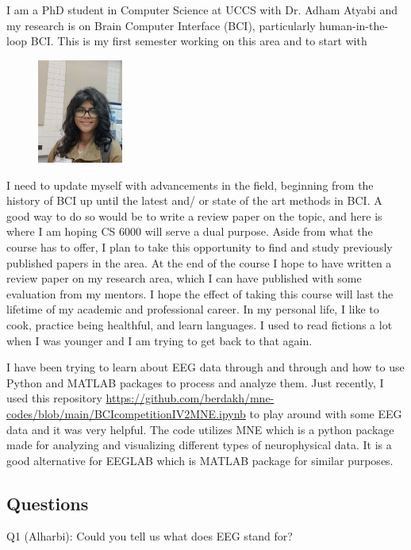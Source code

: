 

% 


I am a PhD student in Computer Science at UCCS with Dr. Adham Atyabi and my research is on Brain Computer Interface (BCI), particularly human-in-the-loop BCI. This is my first semester working on this area and to start with 
\begin{figure} %
    \centering
    \includegraphics[width=0.25\textwidth]{Raisa_Nusrat.jpg}
\end{figure}
I need to update myself with advancements in the field, beginning from the history of BCI up until the latest and/ or state of the art methods in BCI. A good way to do so would be to write a review paper on the topic, and here is where I am hoping CS 6000 will serve a dual purpose. Aside from what the course has to offer, I plan to take this opportunity to find and study previously published papers in the area. At the end of the course I hope to have written a review paper on my research area, which I can have published with some evaluation from my mentors. I hope the effect of taking this course will last the lifetime of my academic and professional career. In my personal life, I like to cook, practice being healthful, and learn languages. I used to read fictions a lot when I was younger and I am trying to get back to that again. 
\vspace{.25 cm}

I have been trying to learn about EEG data through and through and how to use Python and MATLAB packages to process and analyze them. Just recently, I used this repository \url{https://github.com/berdakh/mne-codes/blob/main/BCIcompetitionIV2MNE.ipynb} to play around with some EEG data and it was very helpful. The code utilizes MNE which is a python package made for analyzing and visualizing different types of neurophysical data. It is a good alternative for EEGLAB which is MATLAB package for similar purposes.

\subsection{Questions}

Q1 (Alharbi): Could you tell us what does EEG stand for?

%
